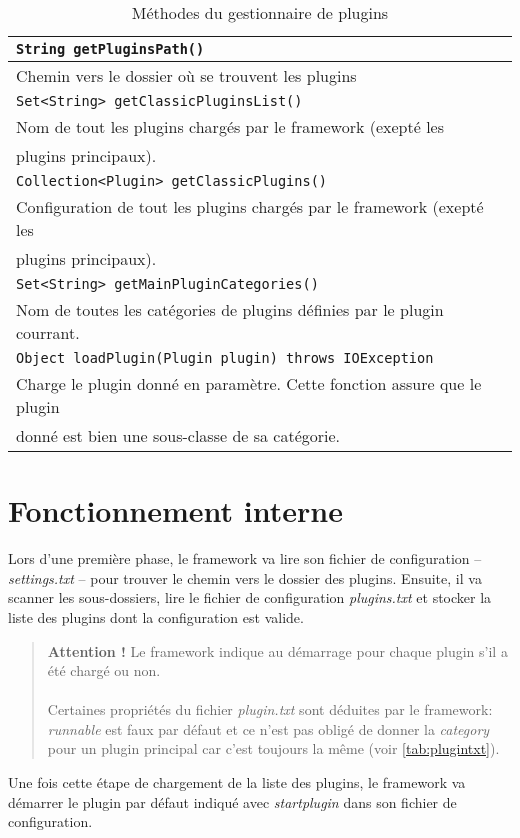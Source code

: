 \documentclass[12pt,a4paper]{article}
\begin{document}
\begin{table}[h]
	\begin{tabular}{|l|}
		\hline
		\texttt{String getPluginsPath()}\\
		\hline
		Chemin vers le dossier où se trouvent les plugins\\
		\hline
			
		\hline
		\texttt{Set<String> getClassicPluginsList()}\\
		\hline
		Nom de tout les plugins chargés par le framework (exepté les \\
		plugins	principaux).\\
		\hline

		\hline
		\texttt{Collection<Plugin> getClassicPlugins()}\\
		\hline
		Configuration de tout les plugins chargés par le framework (exepté les\\ 
		plugins	principaux).\\
		\hline
	
		\hline
		\texttt{Set<String> getMainPluginCategories()}\\
		\hline
		Nom de toutes les catégories de plugins définies par le plugin courrant.\\
		\hline
	
		\hline
		\texttt{Object loadPlugin(Plugin plugin) throws IOException}\\
		\hline
		Charge le plugin donné en paramètre. Cette fonction assure que le plugin\\
		donné est bien une sous-classe de sa catégorie.\\
		\hline
	\end{tabular}	
\caption{Méthodes du gestionnaire de plugins}
\end{table}

\section{Fonctionnement interne}
Lors d'une première phase, le framework va lire son fichier de configuration -- 
\emph{settings.txt} -- pour trouver le chemin vers le dossier des plugins. 
Ensuite, il va scanner les sous-dossiers, lire le fichier de configuration 
\emph{plugins.txt} et stocker la liste des plugins dont la configuration est valide.

\begin{quote}
	\textbf{Attention !} Le framework indique au démarrage pour chaque plugin 
	s'il a été chargé ou non. 
	\\\\
	Certaines propriétés du fichier \emph{plugin.txt} sont déduites par le 
	framework: \emph{runnable} est faux par défaut et ce n'est pas obligé de 
	donner la \emph{category} pour un plugin principal car c'est toujours la 
	même (voir \ref{tab:plugintxt}).
\end{quote}

Une fois cette étape de chargement de la liste des plugins, le framework va 
démarrer le plugin par défaut indiqué avec \emph{startplugin} dans son fichier 
de configuration.
\end{document}
